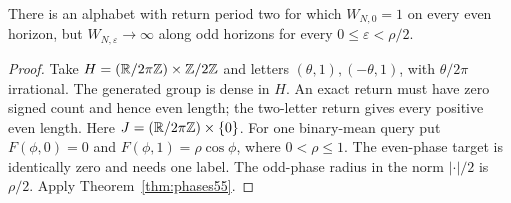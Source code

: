 \begin{proposition}\label{prop:parity55}
There is an alphabet with return period two for which $W_{N,0}=1$ on every even horizon, but $W_{N,\varepsilon}\to\infty$ along odd horizons for every $0\le\varepsilon<\rho/2$.
\end{proposition}
\begin{proof}
Take $H=(\mathbb R/2\pi\mathbb Z)\times\mathbb Z/2\mathbb Z$ and letters $(\theta,1),(-\theta,1)$, with $\theta/2\pi$ irrational. The generated group is dense in $H$. An exact return must have zero signed count and hence even length; the two-letter return gives every positive even length. Here $J=(\mathbb R/2\pi\mathbb Z)\times\{0\}$. For one binary-mean query put $F(\phi,0)=0$ and $F(\phi,1)=\rho\cos\phi$, where $0<\rho\le1$. The even-phase target is identically zero and needs one label. The odd-phase radius in the norm $|\cdot|/2$ is $\rho/2$. Apply Theorem~\ref{thm:phases55}.
\end{proof}
